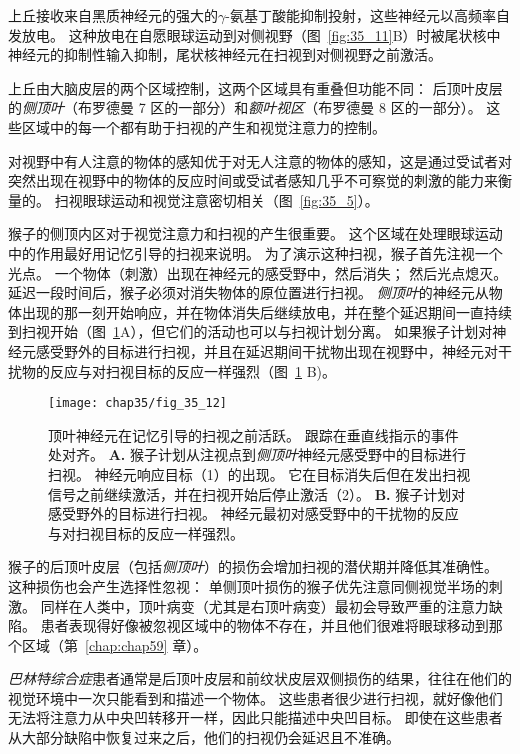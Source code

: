 上丘接收来自黑质神经元的强大的$\gamma$-氨基丁酸能抑制投射，这些神经元以高频率自发放电。
这种放电在自愿眼球运动到对侧视野（图~\ref{fig:35_11}B）时被尾状核中神经元的抑制性输入抑制，尾状核神经元在扫视到对侧视野之前激活。


上丘由大脑皮层的两个区域控制，这两个区域具有重叠但功能不同：
后顶叶皮层的\textit{侧顶叶}（布罗德曼 7 区的一部分）和\textit{额叶视区}（布罗德曼 8 区的一部分）。 
这些区域中的每一个都有助于扫视的产生和视觉注意力的控制。


对视野中有人注意的物体的感知优于对无人注意的物体的感知，这是通过受试者对突然出现在视野中的物体的反应时间或受试者感知几乎不可察觉的刺激的能力来衡量的。
扫视眼球运动和视觉注意密切相关（图~\ref{fig:35_5}）。


猴子的侧顶内区对于视觉注意力和扫视的产生很重要。
这个区域在处理眼球运动中的作用最好用记忆引导的扫视来说明。
为了演示这种扫视，猴子首先注视一个光点。
一个物体（刺激）出现在神经元的感受野中，然后消失；
然后光点熄灭。
延迟一段时间后，猴子必须对消失物体的原位置进行扫视。
\textit{侧顶叶}的神经元从物体出现的那一刻开始响应，并在物体消失后继续放电，并在整个延迟期间一直持续到扫视开始（图~\ref{fig:35_12}A），但它们的活动也可以与扫视计划分离。
如果猴子计划对神经元感受野外的目标进行扫视，并且在延迟期间干扰物出现在视野中，神经元对干扰物的反应与对扫视目标的反应一样强烈（图~\ref{fig:35_12} B)。


\begin{figure}[htbp]
	\centering
	\texttt{[image: chap35/fig\_35\_12]}
	\caption{顶叶神经元在记忆引导的扫视之前活跃。
		跟踪在垂直线指示的事件处对齐\cite{powell2000response}。
		\textbf{A.} 猴子计划从注视点到\textit{侧顶叶}神经元感受野中的目标进行扫视。
		神经元响应目标（1）的出现。
		它在目标消失后但在发出扫视信号之前继续激活，并在扫视开始后停止激活（2）。
		\textbf{B.} 猴子计划对感受野外的目标进行扫视。
		神经元最初对感受野中的干扰物的反应与对扫视目标的反应一样强烈。}
	\label{fig:35_12}
\end{figure}



猴子的后顶叶皮层（包括\textit{侧顶叶}）的损伤会增加扫视的潜伏期并降低其准确性。
这种损伤也会产生选择性忽视：
单侧顶叶损伤的猴子优先注意同侧视觉半场的刺激。
同样在人类中，顶叶病变（尤其是右顶叶病变）最初会导致严重的注意力缺陷。
患者表现得好像被忽视区域中的物体不存在，并且他们很难将眼球移动到那个区域（第~\ref{chap:chap59} 章）。


\textit{巴林特综合症}患者通常是后顶叶皮层和前纹状皮层双侧损伤的结果，往往在他们的视觉环境中一次只能看到和描述一个物体。
这些患者很少进行扫视，就好像他们无法将注意力从中央凹转移开一样，因此只能描述中央凹目标。
即使在这些患者从大部分缺陷中恢复过来之后，他们的扫视仍会延迟且不准确。


